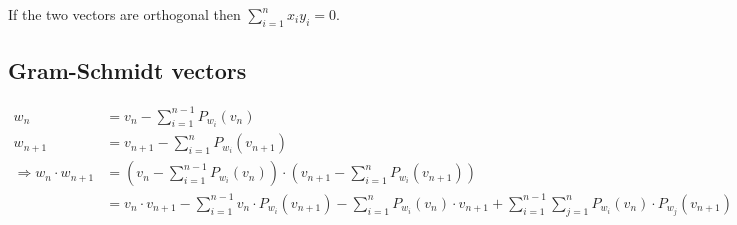 \documentclass{article}
\begin{document}
If the two vectors are orthogonal then $\sum_{i=1}^{n} x_iy_i = 0$.

\subsection{Gram-Schmidt vectors}

\begin{equation}
    \begin{split}
        w_n & = v_n - \sum_{i=1}^{n-1} P_{w_i}(v_n) \\
        w_{n+1} & = v_{n+1} - \sum_{i=1}^{n} P_{w_i}(v_{n+1}) \\
        \Longrightarrow w_n \cdot w_{n+1} & = \left(v_n - \sum_{i=1}^{n-1} P_{w_i}(v_n)\right) \cdot \left(v_{n+1} - \sum_{i=1}^{n} P_{w_i}(v_{n+1})\right) \\
        & = v_n \cdot v_{n+1} - \sum_{i=1}^{n-1} v_n \cdot P_{w_i}(v_{n+1}) - \sum_{i=1}^{n} P_{w_i}(v_n) \cdot v_{n+1} + \sum_{i=1}^{n-1} \sum_{j=1}^{n} P_{w_i}(v_n) \cdot P_{w_j}(v_{n+1}) \\
        
    \end{split}
\end{equation}
\end{document}
